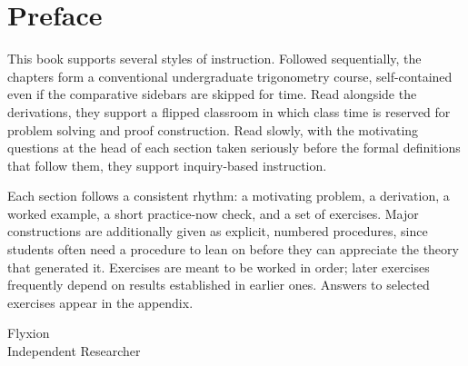 \chapter*{Preface}

This book supports several styles of instruction. Followed sequentially, the
chapters form a conventional undergraduate trigonometry course, self-contained
even if the comparative sidebars are skipped for time. Read alongside the
derivations, they support a flipped classroom in which class time is reserved for
problem solving and proof construction. Read slowly, with the motivating
questions at the head of each section taken seriously before the formal
definitions that follow them, they support inquiry-based instruction.

Each section follows a consistent rhythm: a motivating problem, a derivation, a
worked example, a short practice-now check, and a set of exercises. Major
constructions are additionally given as explicit, numbered procedures, since
students often need a procedure to lean on before they can appreciate the theory
that generated it. Exercises are meant to be worked in order; later exercises
frequently depend on results established in earlier ones. Answers to selected
exercises appear in the appendix.

\bigskip
\noindent Flyxion \\
Independent Researcher

